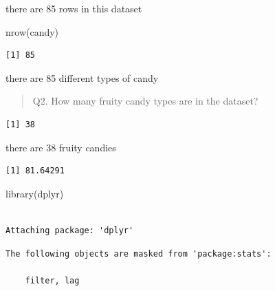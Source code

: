 \documentclass[
  letterpaper,
  DIV=11,
  numbers=noendperiod]{scrartcl}
\newenvironment{Shaded}{\begin{snugshade}}{\end{snugshade}}
\newcommand{\FunctionTok}[1]{\textcolor[rgb]{0.28,0.35,0.67}{#1}}
\newcommand{\NormalTok}[1]{\textcolor[rgb]{0.00,0.23,0.31}{#1}}
\newcommand{\SpecialCharTok}[1]{\textcolor[rgb]{0.37,0.37,0.37}{#1}}
\newcommand{\StringTok}[1]{\textcolor[rgb]{0.13,0.47,0.30}{#1}}
\begin{document}
there are 85 rows in this dataset

\begin{Shaded}
\begin{Highlighting}[]
\FunctionTok{nrow}\NormalTok{(candy)}
\end{Highlighting}
\end{Shaded}

\begin{verbatim}
[1] 85
\end{verbatim}

there are 85 different types of candy

\begin{quote}
Q2. How many fruity candy types are in the dataset?
\end{quote}

\begin{Shaded}
\end{Shaded}

\begin{verbatim}
[1] 38
\end{verbatim}

there are 38 fruity candies

\begin{Shaded}
\end{Shaded}

\begin{verbatim}
[1] 81.64291
\end{verbatim}

\begin{Shaded}
\begin{Highlighting}[]
\FunctionTok{library}\NormalTok{(dplyr)}
\end{Highlighting}
\end{Shaded}

\begin{verbatim}

Attaching package: 'dplyr'
\end{verbatim}

\begin{verbatim}
The following objects are masked from 'package:stats':

    filter, lag
\end{verbatim}
\end{document}
